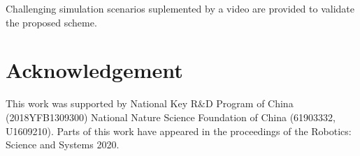 \documentclass[Afour,sageh,times]{sagej}
\begin{document}
Challenging simulation scenarios suplemented by a video are provided to validate the proposed scheme.

\section*{Acknowledgement}
This work was supported by National Key R\&D Program of China (2018YFB1309300) National Nature Science Foundation of China (61903332, U1609210).
Parts of this work have appeared in the proceedings of the Robotics: Science and Systems 2020. 

\vfill




%
%
%
\end{document}
